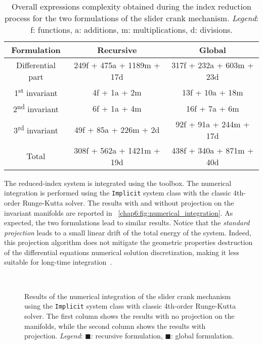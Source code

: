 \begin{table}[ht!]
    \centering
    \caption{Overall expressions complexity obtained during the index reduction process for the two formulations of the slider crank mechanism. \emph{Legend}: f: functions, a: additions, m: multiplications, d: divisions.}
    \label{chap6:chap6:tab:index_reduction}
    \begin{tabular}{c@{\hskip 5mm}c@{\hskip 5mm}c}
        \toprule
        \textbf{Formulation}  & \textbf{Recursive} & \textbf{Global} \\
        \midrule
        Differential part               & 249f + 475a  + 1189m + 17d & 317f + 232a + 603m + 23d \\
        1\textsuperscript{st} invariant & 4f   + 1a    + 2m          & 13f  + 10a  + 18m \\
        2\textsuperscript{nd} invariant & 6f   + 1a    + 4m          & 16f  + 7a   + 6m \\
        3\textsuperscript{rd} invariant & 49f  + 85a   + 226m + 2d   & 92f  + 91a  + 244m + 17d \\
        \midrule
        Total                           & 308f + 562a + 1421m + 19d  & 438f + 340a + 871m + 40d \\
        \bottomrule
    \end{tabular}
\end{table}

The reduced-index system is integrated using the \Indigo{} \Matlab{} toolbox. The numerical integration is performed using the \texttt{Implicit} system class with the classic 4th-order Runge-Kutta solver. The results with and without projection on the invariant manifolds are reported in \figurename~\ref{chap6:fig:numerical_integration}. As expected, the two formulations lead to similar results. Notice that the \emph{standard projection} leads to a small linear drift of the total energy of the system. Indeed, this projection algorithm does not mitigate the geometric properties destruction of the differential equations numerical solution discretization, making it less suitable for long-time integration~\cite{hairer2000symmetric}.

\begin{figure}[htp]
    \centering
    \hfill
    \vspace*{-0.0pt}
    \hspace*{1.5pt} \\
    \hfill
    \caption{Results of the numerical integration of the slider crank mechanism using the \texttt{Implicit} system class with classic 4th-order Runge-Kutta solver. The first column shows the results with no projection on the manifolds, while the second column shows the results with projection. \emph{Legend}: {\color{mycolor1}$\blacksquare$}: recursive formulation, {\color{mycolor2}$\blacksquare$}: global formulation.}
    \label{chap6:chap6:fig:numerical_integration}
\end{figure}

